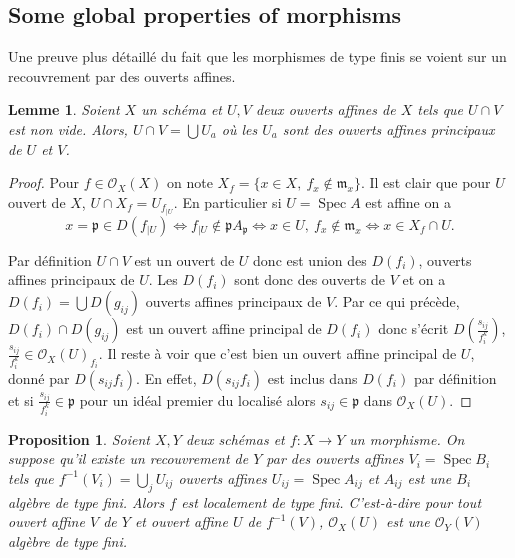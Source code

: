 \documentclass[A4, 11pt]{article}
\newtheorem{prop}[defin]{Proposition}
\newtheorem{lem}[defin]{Lemme}
\begin{document}
 \subsection{Some global properties of morphisms}
 Une preuve plus détaillé du fait que les morphismes de type finis se voient sur un recouvrement par des ouverts affines.
 \begin{lem} Soient $X$ un schéma et $U,V$ deux ouverts affines de $X$ tels que $U\cap V$ est non vide. Alors, $U\cap V= \bigcup U_a$ où les $U_a$ sont des ouverts affines principaux de $U$ et $V$. 
\end{lem}
\begin{proof}
Pour $f\in \mathcal{O}_X(X)$ on note $X_f=\{x\in X,~ f_x\notin \mathfrak{m}_x\}$. Il est clair que pour $U$ ouvert de $X$, $U\cap X_f= U_{f_{|U}}$. En particulier si $U=\operatorname{Spec} A$ est affine on a 
$$x=\mathfrak{p}\in D(f_{|U})\iff f_{|U}\notin \mathfrak{p}A_{\mathfrak{p}} \iff x\in U, ~f_x \notin \mathfrak{m}_x \iff x\in X_f\cap U.$$ 

Par définition $U\cap V$ est un ouvert de $U$ donc est union des $D(f_i)$, ouverts affines principaux de $U$. Les $D(f_i)$ sont donc des ouverts de $V$ et on a $D(f_i)=\bigcup D(g_{ij})$ ouverts affines principaux de $V$. Par ce qui précède, $D(f_i)\cap D(g_{ij})$ est un ouvert affine principal de $D(f_i)$ donc s'écrit $D( \frac{s_{ij}}{f_i^k})$, $\frac{s_{ij}}{f_i^k}\in \mathcal{O}_X(U)_{f_i}$. Il reste à voir que c'est bien un ouvert affine principal de $U$, donné par $D(s_{ij}f_i)$. En effet, $D(s_{ij}f_i)$ est inclus dans $D(f_i)$ par définition et si $\frac{s_{ij}}{f_i^k}\in \mathfrak{p}$ pour un idéal premier du localisé alors $s_{ij}\in \mathfrak{p}$ dans $\mathcal{O}_X(U)$. 
\end{proof}
\begin{prop}
Soient $X,Y$ deux schémas et $f:X\rightarrow Y$ un morphisme. On suppose qu'il existe un recouvrement de $Y$ par des ouverts affines $V_i=\operatorname{Spec}B_i$ tels que $f^{-1}(V_i)=\bigcup_{j} U_{ij}$ ouverts affines $U_{ij}=\operatorname{Spec} A_{ij}$ et $A_{ij}$ est une $B_i$ algèbre de type fini. Alors $f$ est localement de type fini. C'est-à-dire pour tout ouvert affine $V$ de $Y$ et ouvert affine $U$ de $f^{-1}(V)$, $\mathcal{O}_X(U)$ est une $\mathcal{O}_Y(V)$ algèbre de type fini. 
\end{prop}
\end{document}
